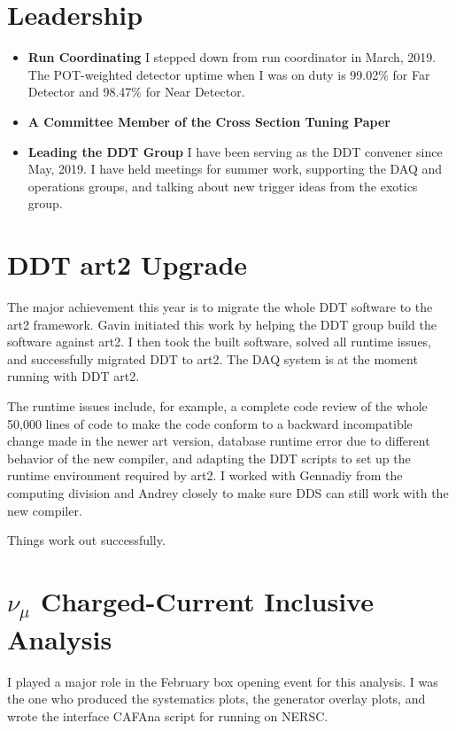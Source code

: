 \documentclass[]{report}   %
\begin{document}
\section*{Leadership}
\begin{itemize}
  \item \textbf{Run Coordinating} I stepped down from run coordinator in March, 2019. The POT-weighted detector uptime when I was on duty is 99.02\% for Far Detector and 98.47\% for Near Detector.
  \item \textbf{A Committee Member of the Cross Section Tuning Paper}
  \item \textbf{Leading the DDT Group} I have been serving as the DDT convener since May, 2019. I have held meetings for summer work, supporting the DAQ and operations groups, and talking about new trigger ideas from the exotics group.
\end{itemize}


\section*{DDT art2 Upgrade}
The major achievement this year is to migrate the whole DDT software to the art2 framework. Gavin initiated this work by helping the DDT group build the software against art2. I then took the built software, solved all runtime issues, and successfully migrated DDT to art2. The DAQ system is at the moment running with DDT art2.

The runtime issues include, for example, a complete code review of the whole 50,000 lines of code to make the code conform to a backward incompatible change made in the newer art version, database runtime error due to different behavior of the new compiler, and adapting the DDT scripts to set up the runtime environment required by art2. I worked with Gennadiy from the computing division and Andrey closely to make sure DDS can still work with the new compiler.

Things work out successfully.



\section*{$\nu_\mu$ Charged-Current Inclusive Analysis}
I played a major role in the February box opening event for this analysis. I was the one who produced the systematics plots, the generator overlay plots, and wrote the interface CAFAna script for running on NERSC.
\end{document}
